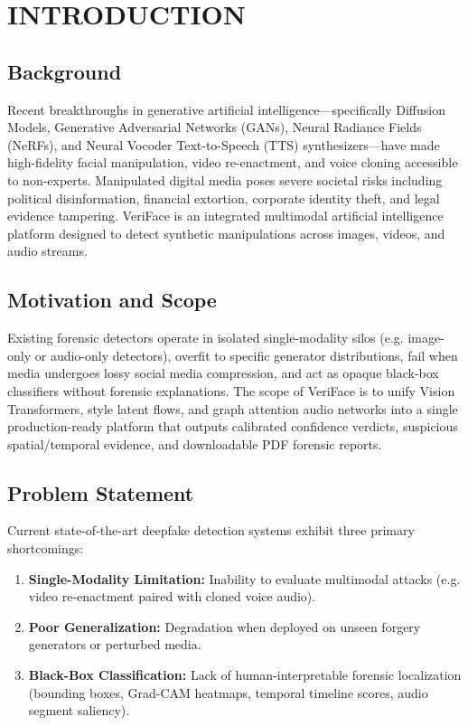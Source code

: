 \documentclass[12pt,a4paper]{report}
\begin{document}
\tableofcontents
\clearpage
{}

\chapter{INTRODUCTION}

\section{Background}
Recent breakthroughs in generative artificial intelligence---specifically Diffusion Models, Generative Adversarial Networks (GANs), Neural Radiance Fields (NeRFs), and Neural Vocoder Text-to-Speech (TTS) synthesizers---have made high-fidelity facial manipulation, video re-enactment, and voice cloning accessible to non-experts. Manipulated digital media poses severe societal risks including political disinformation, financial extortion, corporate identity theft, and legal evidence tampering. VeriFace is an integrated multimodal artificial intelligence platform designed to detect synthetic manipulations across images, videos, and audio streams.

\section{Motivation and Scope}
Existing forensic detectors operate in isolated single-modality silos (e.g. image-only or audio-only detectors), overfit to specific generator distributions, fail when media undergoes lossy social media compression, and act as opaque black-box classifiers without forensic explanations. The scope of VeriFace is to unify Vision Transformers, style latent flows, and graph attention audio networks into a single production-ready platform that outputs calibrated confidence verdicts, suspicious spatial/temporal evidence, and downloadable PDF forensic reports.

\section{Problem Statement}
Current state-of-the-art deepfake detection systems exhibit three primary shortcomings:
\begin{enumerate}[label=\arabic*.,leftmargin=*]
    \item \textbf{Single-Modality Limitation:} Inability to evaluate multimodal attacks (e.g. video re-enactment paired with cloned voice audio).
    \item \textbf{Poor Generalization:} Degradation when deployed on unseen forgery generators or perturbed media.
    \item \textbf{Black-Box Classification:} Lack of human-interpretable forensic localization (bounding boxes, Grad-CAM heatmaps, temporal timeline scores, audio segment saliency).
\end{enumerate}
\end{document}
